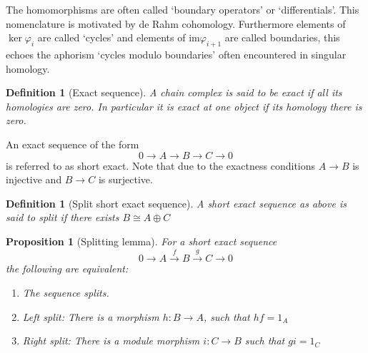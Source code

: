 \documentclass[12pt]{report}
\numberwithin{equation}{section}
\newcounter{dummy} \numberwithin{dummy}{section}
\newtheorem{definition}[dummy]{Definition}
\newtheorem{proposition}[dummy]{Proposition}
\begin{document}
	
	The homomorphisms are often called {`boundary operators'} or {`differentials'}. This nomenclature is motivated by de Rahm cohomology. Furthermore elements of $\ker \varphi_i$ are called `{cycles}' and elements of $\mathrm{im} \varphi_{i+1}$ are called {boundaries}, this echoes the aphorism `cycles modulo boundaries' often encountered in singular homology.
	\begin{definition}[Exact sequence]
		A chain complex is said to be {exact} if all its homologies are zero. In particular it is exact at one object if its homology there is zero.
	\end{definition}
	 An exact sequence of the form \[ 0 \to A \to B \to C \to 0 \]
	is referred to as short exact. Note that due to the exactness conditions $A \to B $ is injective and $B \to C$ is surjective.
	\begin{definition}[Split short exact sequence]
		A short exact sequence as above is said to split if there exists $B \cong A \oplus C$
	\end{definition}
	\begin{proposition}[Splitting lemma]
		For a short exact sequence $$0 \to A \xrightarrow{f} B \xrightarrow{g} C \to 0$$ the following are equivalent:
		\begin{enumerate}
			\item The sequence splits.
			\item Left split: There is a morphism $h:B \to A $, such that $hf=1_A$
			\item Right split: There is a module morphism $i: C \to B $ such that $gi=1_C$
		\end{enumerate}
	\end{proposition}
%		
%		
	
\end{document}
